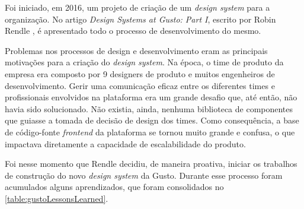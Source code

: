 Foi iniciado, em 2016, um projeto de criação de um \textit{design system} para a organização. No artigo \textit{Design Systems at Gusto: Part I}, escrito por Robin Rendle \cite{gustoDesignSystem}, é apresentado todo o processo de desenvolvimento do mesmo.

Problemas nos processos de design e desenvolvimento eram as principais motivações para a criação do \textit{design system}. Na época, o time de produto da empresa era composto por 9 designers de produto e muitos engenheiros de desenvolvimento. Gerir uma comunicação eficaz entre os diferentes times e profissionais envolvidos na plataforma era um grande desafio que, até então, não havia sido solucionado. Não existia, ainda, nenhuma biblioteca de componentes que guiasse a tomada de decisão de design dos times. Como consequência, a base de código-fonte \textit{frontend} da plataforma se tornou muito grande e confusa, o que impactava diretamente a capacidade de escalabilidade do produto.

Foi nesse momento que Rendle decidiu, de maneira proativa, iniciar os trabalhos de construção do novo \textit{design system} da Gusto. Durante esse processo foram acumulados alguns aprendizados, que foram consolidados no \autoref{table:gustoLessonsLearned}.

